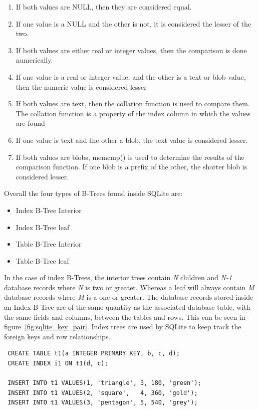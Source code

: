 \begin{enumerate} 
	\item If both values are NULL, then they are considered equal.
	\item If one value is a NULL and the other is not, it is considered the lesser of the two.
	\item If both values are either real or integer values, then the comparison is done numerically.
	\item If one value is a real or integer value, and the other is a text or blob value, then the numeric value is considered lesser
	\item If both values are text, then the collation function is used to compare them. The collation function is a property of the index column in which the values are found
	\item If one value is text and the other a blob, the text value is considered lesser.
	\item If both values are blobs, memcmp() is used to determine the results of the comparison function. If one blob is a prefix of the other, the shorter blob is considered lesser. 
\end{enumerate}
  
Overall the four types of B-Trees found inside SQLite are:

\begin{itemize} 
	\item Index B-Tree Interior
	\item Index B-Tree leaf
	\item Table B-Tree Interior
	\item Table B-Tree leaf 
\end{itemize} 

In the case of index B-Trees, the interior trees contain \textit{N} children and \textit{N-1} database records where \textit{N} is two or greater. Whereas a leaf will always contain \textit{M} database records where \textit{M} is a one or greater. The database records stored inside an Index B-Tree are of the same quantity as the associated database table, with the same fields and columns, between the tables and rows. This can be seen in figure~\ref{fig:sqlite_key_pair}. Index trees are used by SQLite to keep track the foreign keys and row relationships.

\begin{lstlisting}
 CREATE TABLE t1(a INTEGER PRIMARY KEY, b, c, d);
 CREATE INDEX i1 ON t1(d, c);

 INSERT INTO t1 VALUES(1, 'triangle', 3, 180, 'green');
 INSERT INTO t1 VALUES(2, 'square',   4, 360, 'gold');
 INSERT INTO t1 VALUES(3, 'pentagon', 5, 540, 'grey');
\end{lstlisting}

